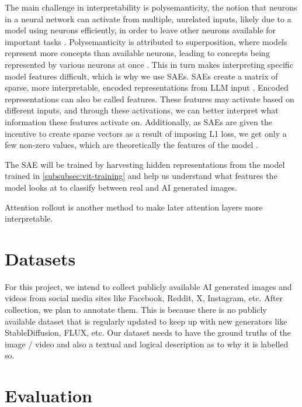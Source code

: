 \documentclass[10pt,twocolumn,letterpaper]{article}
\begin{document}
The main challenge in interpretability is polysemanticity, the notion that neurons in a neural network can activate from multiple, unrelated inputs, likely due to a model using neurons efficiently, in order to leave other neurons available for important tasks \cite{olah2020zoom}. Polysemanticity is attributed to superposition, where models represent more concepts than available neurons, leading to concepts being represented by various neurons at once  \cite{karvonen_intuitive_2024}.  This in turn makes interpreting specific model features difficult, which is why we use SAEs. SAEs create a matrix of sparse, more interpretable, encoded representations from LLM input  \cite{karvonen_intuitive_2024}. Encoded representations can also be called features. These features may activate based on different inputs, and through these activations, we can better interpret what information these features activate on. Additionally, as SAEs are given the incentive to create sparse vectors as a result of imposing L1 loss, we get only a few non-zero values, which are theoretically the  features of the model \cite{kutsyk_sparse_2024}. 

The SAE will be trained by harvesting hidden representations from the model trained in \ref{subsubsec:vit-training} and help us understand what features the model looks at to classify between real and AI generated images.



Attention rollout \cite{abnarQuantifyingAttentionFlow2020} is another method to make later attention layers more interpretable.

\section{Datasets}
For this project, we intend to collect publicly available AI generated images  and videos from social media sites like Facebook, Reddit, X, Instagram, etc. After collection, we plan to annotate them. This is because there is no publicly available dataset that is regularly updated to keep up with new generators like StableDiffusion, FLUX, etc. Our dataset needs to have the ground truths of the image / video and also a textual and logical description as to  why it is labelled so. 

\section{Evaluation}
\end{document}
